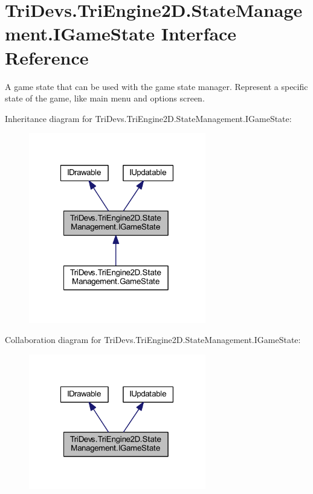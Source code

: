 \hypertarget{interface_tri_devs_1_1_tri_engine2_d_1_1_state_management_1_1_i_game_state}{\section{Tri\-Devs.\-Tri\-Engine2\-D.\-State\-Management.\-I\-Game\-State Interface Reference}
\label{interface_tri_devs_1_1_tri_engine2_d_1_1_state_management_1_1_i_game_state}
}


A game state that can be used with the game state manager. Represent a specific state of the game, like main menu and options screen.  




Inheritance diagram for Tri\-Devs.\-Tri\-Engine2\-D.\-State\-Management.\-I\-Game\-State\-:
\nopagebreak
\begin{figure}[H]
\begin{center}
\leavevmode
\includegraphics[width=219pt]{interface_tri_devs_1_1_tri_engine2_d_1_1_state_management_1_1_i_game_state__inherit__graph}
\end{center}
\end{figure}


Collaboration diagram for Tri\-Devs.\-Tri\-Engine2\-D.\-State\-Management.\-I\-Game\-State\-:
\nopagebreak
\begin{figure}[H]
\begin{center}
\leavevmode
\includegraphics[width=219pt]{interface_tri_devs_1_1_tri_engine2_d_1_1_state_management_1_1_i_game_state__coll__graph}
\end{center}
\end{figure}

